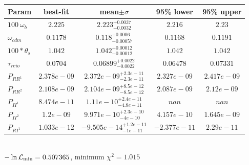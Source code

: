 \begin{tabular}{|l|c|c|c|c|} 
 \hline 
Param & best-fit & mean$\pm\sigma$ & 95\% lower & 95\% upper \\ \hline 
$100~\omega_{b }$ &$2.225$ & $2.223_{-0.0032}^{+0.0037}$ & $2.216$ & $2.23$ \\ 
$\omega_{cdm }$ &$0.1178$ & $0.118_{-0.00057}^{+0.0006}$ & $0.1168$ & $0.1191$ \\ 
$100*\theta_{s }$ &$1.042$ & $1.042_{-0.00012}^{+0.00012}$ & $1.042$ & $1.042$ \\ 
$\tau_{reio }$ &$0.0704$ & $0.06899_{-0.0022}^{+0.0022}$ & $0.06478$ & $0.07331$ \\ 
$P_{{RR}^1 }$ &$2.378e-09$ & $2.372e-09_{-2.3e-11}^{+2.3e-11}$ & $2.327e-09$ & $2.417e-09$ \\ 
$P_{{RR}^2 }$ &$2.108e-09$ & $2.104e-09_{-8.5e-12}^{+8.5e-12}$ & $2.087e-09$ & $2.12e-09$ \\ 
$P_{{II}^1 }$ &$8.474e-11$ & $1.11e-10_{-4.8e-11}^{+2.4e-11}$ & $nan$ & $nan$ \\ 
$P_{{II}^2 }$ &$1.2e-09$ & $9.971e-10_{-4e-10}^{+2.3e-10}$ & $4.157e-10$ & $1.645e-09$ \\ 
$P_{{RI}^1 }$ &$1.033e-12$ & $-9.505e-14_{-1e-11}^{+1.2e-11}$ & $-2.377e-11$ & $2.29e-11$ \\ 
\hline 
 \end{tabular} \\ 
$-\ln{\cal L}_\mathrm{min} =0.507365$, minimum $\chi^2=1.015$ \\ 
